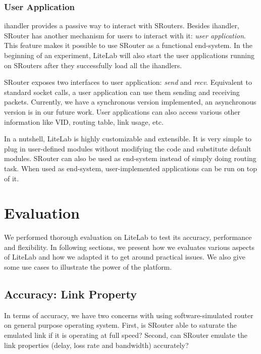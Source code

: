 \documentclass[conference]{IEEEtran}
\begin{document}
\subsubsection{User Application}
ihandler provides a passive way to interact with SRouters.  Besides
ihandler, SRouter has another mechanism for users to interact with it:
\textit{user application}. This feature makes it possible to use
SRouter as a functional end-system. In the beginning of an experiment,
LiteLab will also start the user applications running on SRouters
after they successfully load all the ihandlers.

SRouter exposes two interfaces to user application: \textit{send} and
\textit{recv}. Equivalent to standard socket calls, a user application
can use them sending and receiving packets. Currently, we have a
synchronous version implemented, an asynchronous version is in our
future work. User applications can also access various other
information like VID, routing table, link usage, etc.




In a nutshell, LiteLab is highly customizable and extensible. It is
very simple to plug in user-defined modules without modifying the code
and substitute default modules.
SRouter can also be used as end-system instead of simply doing routing
task. When used as end-system, user-implemented applications can be
run on top of
it. 





\section{Evaluation}
\label{sec:evaluation}





We performed thorough evaluation on LiteLab to test its accuracy,
performance and flexibility. In following sections, we present how we
evaluates various aspects of LiteLab and how we adapted it to get
around practical issues. We also give some use cases to illustrate the
power of the platform.

\subsection{Accuracy: Link Property}
\label{sec:evaluation:validate}

In terms of accuracy, we have two concerns with using
software-simulated router on general purpose operating system.  First,
is SRouter able to saturate the emulated link if it is operating at
full speed? Second, can SRouter emulate the link properties (delay,
loss rate and bandwidth) accurately?
\end{document}
